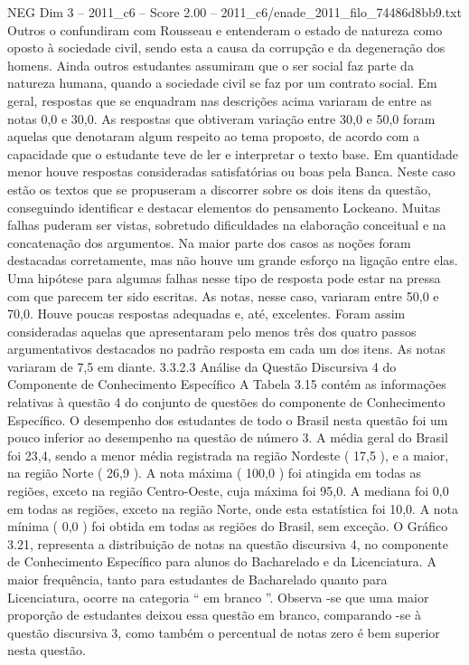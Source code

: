 \begin{textsample}{NEG Dim 3 – 2011\_c6 – Score 2.00 – 2011\_c6/enade\_2011\_filo\_74486d8bb9.txt}
Outros o confundiram com Rousseau e entenderam o estado de natureza como oposto à sociedade civil, sendo esta a causa da corrupção e da degeneração dos homens.
Ainda outros estudantes assumiram que o ser social faz parte da natureza humana, quando a sociedade civil se faz por um contrato social.
Em geral, respostas que se enquadram nas descrições acima variaram de entre as notas 0,0 e 30,0.
As respostas que obtiveram variação entre 30,0 e 50,0 foram aquelas que denotaram algum respeito ao tema proposto, de acordo com a capacidade que o estudante teve de ler e interpretar o texto base.
Em quantidade menor houve respostas consideradas satisfatórias ou boas pela Banca.
Neste caso estão os textos que se propuseram a discorrer sobre os dois itens da questão, conseguindo identificar e destacar elementos do pensamento Lockeano.
Muitas falhas puderam ser vistas, sobretudo dificuldades na elaboração conceitual e na concatenação dos argumentos.
Na maior parte dos casos as noções foram destacadas corretamente, mas não houve um grande esforço na ligação entre elas.
Uma hipótese para algumas falhas nesse tipo de resposta pode estar na pressa com que parecem ter sido escritas.
As notas, nesse caso, variaram entre 50,0 e 70,0.
Houve poucas respostas adequadas e, até, excelentes.
Foram assim consideradas aquelas que apresentaram pelo menos três dos quatro passos argumentativos destacados no padrão resposta em cada um dos itens.
As notas variaram de 7,5 em diante. 3.3.2.3 Análise da Questão Discursiva 4 do Componente de Conhecimento Específico A Tabela 3.15 contém as informações relativas à questão 4 do conjunto de questões do componente de Conhecimento Específico.
O desempenho dos estudantes de todo o Brasil nesta questão foi um pouco inferior ao desempenho na questão de número 3.
A média geral do Brasil foi 23,4, sendo a menor média registrada na região Nordeste ( 17,5 ), e a maior, na região Norte ( 26,9 ).
A nota máxima ( 100,0 ) foi atingida em todas as regiões, exceto na região Centro-Oeste, cuja máxima foi 95,0.
A mediana foi 0,0 em todas as regiões, exceto na região Norte, onde esta estatística foi 10,0.
A nota mínima ( 0,0 ) foi obtida em todas as regiões do Brasil, sem exceção.
O Gráfico 3.21, representa a distribuição de notas na questão discursiva 4, no componente de Conhecimento Específico para alunos do Bacharelado e da Licenciatura.
A maior frequência, tanto para estudantes de Bacharelado quanto para Licenciatura, ocorre na categoria “ em branco ”.
Observa -se que uma maior proporção de estudantes deixou essa questão em branco, comparando -se à questão discursiva 3, como também o percentual de notas zero é bem superior nesta questão.

\end{textsample}
